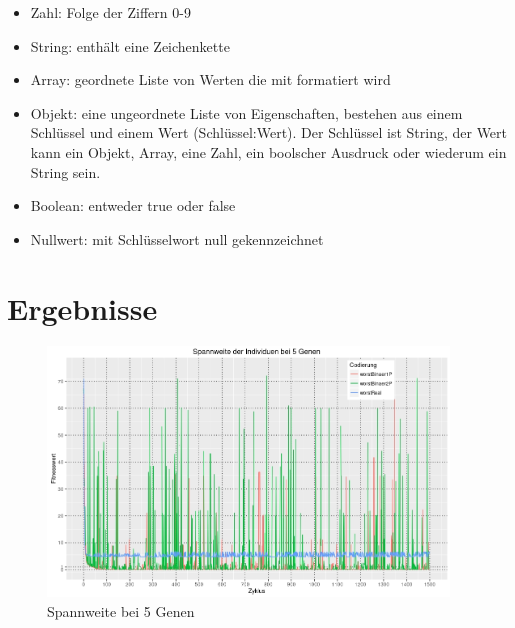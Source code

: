\documentclass[12pt,
    a4paper,
    headinclude,
    footinclude]{scrreprt}
\begin{document}
	\begin{itemize}
	
	
	\item Zahl: Folge der Ziffern 0-9
	\item String: enthält eine Zeichenkette
	\item Array: geordnete Liste von Werten die mit  formatiert wird
	\item Objekt: eine ungeordnete Liste von Eigenschaften, bestehen aus einem Schlüssel und einem Wert (Schlüssel:Wert). Der Schlüssel ist String, der Wert kann ein Objekt, Array, eine Zahl, ein boolscher Ausdruck oder wiederum ein String sein. 
	\item Boolean: entweder true oder false
	\item Nullwert: mit Schlüsselwort null gekennzeichnet
	
	
\end{itemize}
	



	
\section*{Ergebnisse}	


		\begin{figure}[H]
			\includegraphics[width=0.95\textwidth]{spannweite-5-gene.jpeg} 
			
			\caption{Spannweite bei 5 Genen} 
			\label{InputOutput}
		\end{figure}

	
	

	

	
	

	

	
\end{document}
